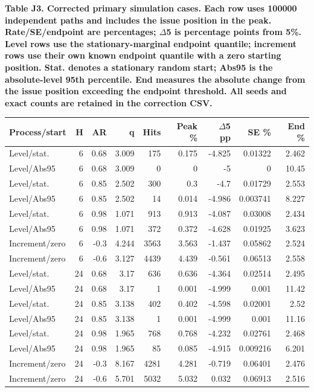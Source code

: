 \documentclass[10pt,a4paper]{article}
\begin{document}
\begin{center}
\begin{minipage}{\linewidth}
\small\textbf{Table J3. Corrected primary simulation cases. Each row uses 100000 independent paths and includes the issue position in the peak. Rate/SE/endpoint are percentages; \(\Delta\)5 is percentage points from 5\%. Level rows use the stationary-marginal endpoint quantile; increment rows use their own known endpoint quantile with a zero starting position. Stat. denotes a stationary random start; Abs95 is the absolute-level 95th percentile. End measures the absolute change from the issue position exceeding the endpoint threshold. All seeds and exact counts are retained in the correction CSV.}\par\medskip
\centering\fontsize{8}{10}\selectfont
\begin{tabular}{lrrrrrrrr}
\toprule
Process/start & H & AR & q & Hits & Peak \% & \(\Delta\)5 pp & SE \% & End \% \\
\midrule
Level/stat. & 6 & 0.68 & 3.009 & 175 & 0.175 & -4.825 & 0.01322 & 2.462 \\
Level/Abs95 & 6 & 0.68 & 3.009 & 0 & 0 & -5 & 0 & 10.45 \\
Level/stat. & 6 & 0.85 & 2.502 & 300 & 0.3 & -4.7 & 0.01729 & 2.553 \\
Level/Abs95 & 6 & 0.85 & 2.502 & 14 & 0.014 & -4.986 & 0.003741 & 8.227 \\
Level/stat. & 6 & 0.98 & 1.071 & 913 & 0.913 & -4.087 & 0.03008 & 2.434 \\
Level/Abs95 & 6 & 0.98 & 1.071 & 372 & 0.372 & -4.628 & 0.01925 & 3.623 \\
Increment/zero & 6 & -0.3 & 4.244 & 3563 & 3.563 & -1.437 & 0.05862 & 2.524 \\
Increment/zero & 6 & -0.6 & 3.127 & 4439 & 4.439 & -0.561 & 0.06513 & 2.558 \\
Level/stat. & 24 & 0.68 & 3.17 & 636 & 0.636 & -4.364 & 0.02514 & 2.495 \\
Level/Abs95 & 24 & 0.68 & 3.17 & 1 & 0.001 & -4.999 & 0.001 & 11.42 \\
Level/stat. & 24 & 0.85 & 3.138 & 402 & 0.402 & -4.598 & 0.02001 & 2.52 \\
Level/Abs95 & 24 & 0.85 & 3.138 & 1 & 0.001 & -4.999 & 0.001 & 11.16 \\
Level/stat. & 24 & 0.98 & 1.965 & 768 & 0.768 & -4.232 & 0.02761 & 2.468 \\
Level/Abs95 & 24 & 0.98 & 1.965 & 85 & 0.085 & -4.915 & 0.009216 & 6.201 \\
Increment/zero & 24 & -0.3 & 8.167 & 4281 & 4.281 & -0.719 & 0.06401 & 2.476 \\
Increment/zero & 24 & -0.6 & 5.701 & 5032 & 5.032 & 0.032 & 0.06913 & 2.516 \\
\bottomrule
\end{tabular}
\end{minipage}
\end{center}
\end{document}
